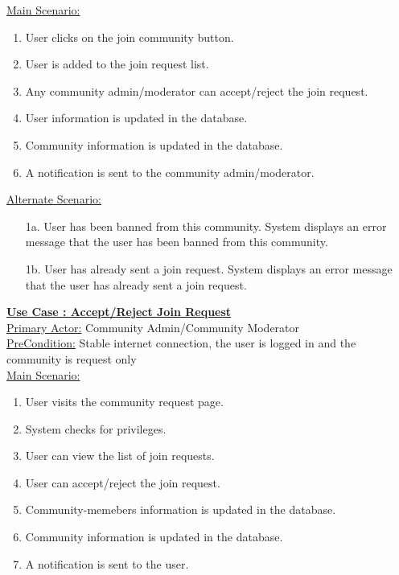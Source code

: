 \documentclass[conference,compsoc]{IEEEtran}
\newcounter{UC}
\newcommand{\nextU}{\stepcounter{UC}\theUC}
\begin{document}
\underline{Main Scenario:}\\
\begin{enumerate}
    \item User clicks on the join community button.
    \item User is added to the join request list.
    \item Any community admin/moderator can accept/reject the join request.
    \item User information is updated in the database.
    \item Community information is updated in the database.
    \item A notification is sent to the community admin/moderator.
\end{enumerate}

\underline{Alternate Scenario:}\\
\begin{enumerate}
    \item [1a.] User has been banned from this community. System displays an error message that the user has been banned from this community.
    \item [1b.] User has already sent a join request. System displays an error message that the user has already sent a join request.
\end{enumerate}

\underline{\textbf{Use Case \nextU: Accept/Reject Join Request}}\\

\underline{Primary Actor:} Community Admin/Community Moderator\\

\underline{PreCondition:} Stable internet connection, the user is logged in and the community is request only\\

\underline{Main Scenario:}\\
\begin{enumerate}
    \item User visits the community request page.
    \item System checks for privileges.
    \item User can view the list of join requests.
    \item User can accept/reject the join request.
    \item Community-memebers information is updated in the database.
    \item Community information is updated in the database.
    \item A notification is sent to the user.
\end{enumerate}
\end{document}

